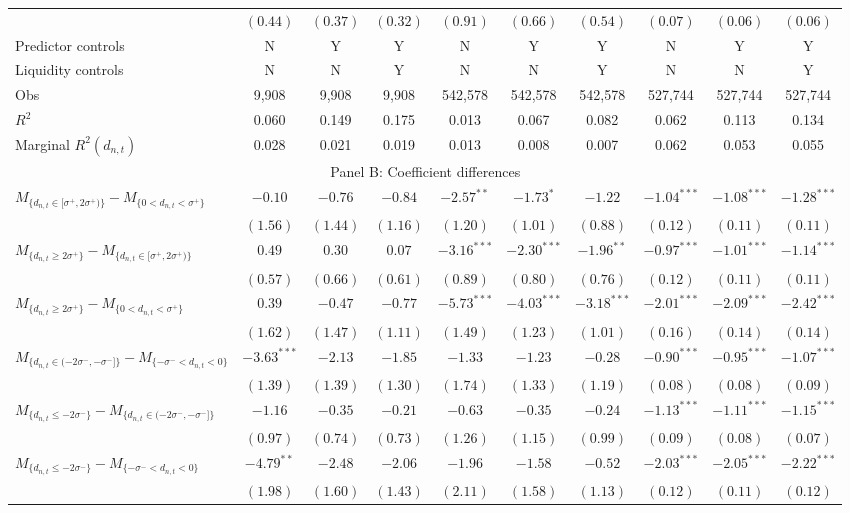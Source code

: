 \begin{tabular}{lccccccccc}
  \vspace{5pt}  & $(0.44)$ & $(0.37)$ & $(0.32)$ & $(0.91)$ & $(0.66)$ & $(0.54)$ & $(0.07)$ & $(0.06)$ & $(0.06)$ \\
  Predictor controls & N & Y & Y & N & Y & Y & N & Y & Y \\
  \vspace{5pt}Liquidity controls & N & N & Y & N & N & Y & N & N & Y \\
  Obs & 9,908 & 9,908 & 9,908 & 542,578 & 542,578 & 542,578 & 527,744 & 527,744 & 527,744 \\
  $R^2$ & 0.060 & 0.149 & 0.175 & 0.013 & 0.067 & 0.082 & 0.062 & 0.113 & 0.134 \\
  Marginal $R^2(d_{n,t})$ & 0.028 & 0.021 & 0.019 & 0.013 & 0.008 & 0.007 & 0.062 & 0.053 & 0.055 \\
   \hline \multicolumn{10}{c}{Panel B: Coefficient differences} \\
 \hline  $M_{\{d_{n,t} \in [\sigma^+, 2\sigma^+)\}} - M_{\{0 < d_{n,t} < \sigma^+\}}$ & $-0.10$ & $-0.76$ & $-0.84$ & $-2.57^{**}$ & $-1.73^{*}$ & $-1.22$ & $-1.04^{***}$ & $-1.08^{***}$ & $-1.28^{***}$ \\
   & $(1.56)$ & $(1.44)$ & $(1.16)$ & $(1.20)$ & $(1.01)$ & $(0.88)$ & $(0.12)$ & $(0.11)$ & $(0.11)$ \\
  $M_{\{d_{n,t} \ge 2\sigma^+\}} - M_{\{d_{n,t} \in [\sigma^+, 2\sigma^+)\}}$ & $0.49$ & $0.30$ & $0.07$ & $-3.16^{***}$ & $-2.30^{***}$ & $-1.96^{**}$ & $-0.97^{***}$ & $-1.01^{***}$ & $-1.14^{***}$ \\
   & $(0.57)$ & $(0.66)$ & $(0.61)$ & $(0.89)$ & $(0.80)$ & $(0.76)$ & $(0.12)$ & $(0.11)$ & $(0.11)$ \\
  $M_{\{d_{n,t} \ge 2\sigma^+\}} - M_{\{0 < d_{n,t} < \sigma^+\}}$ & $0.39$ & $-0.47$ & $-0.77$ & $-5.73^{***}$ & $-4.03^{***}$ & $-3.18^{***}$ & $-2.01^{***}$ & $-2.09^{***}$ & $-2.42^{***}$ \\
   & $(1.62)$ & $(1.47)$ & $(1.11)$ & $(1.49)$ & $(1.23)$ & $(1.01)$ & $(0.16)$ & $(0.14)$ & $(0.14)$ \\
  $M_{\{d_{n,t} \in (-2\sigma^-, -\sigma^-]\}} - M_{\{-\sigma^- < d_{n,t} < 0\}}$ & $-3.63^{***}$ & $-2.13$ & $-1.85$ & $-1.33$ & $-1.23$ & $-0.28$ & $-0.90^{***}$ & $-0.95^{***}$ & $-1.07^{***}$ \\
   & $(1.39)$ & $(1.39)$ & $(1.30)$ & $(1.74)$ & $(1.33)$ & $(1.19)$ & $(0.08)$ & $(0.08)$ & $(0.09)$ \\
  $M_{\{d_{n,t} \le -2\sigma^-\}} - M_{\{d_{n,t} \in (-2\sigma^-, -\sigma^-]\}}$ & $-1.16$ & $-0.35$ & $-0.21$ & $-0.63$ & $-0.35$ & $-0.24$ & $-1.13^{***}$ & $-1.11^{***}$ & $-1.15^{***}$ \\
   & $(0.97)$ & $(0.74)$ & $(0.73)$ & $(1.26)$ & $(1.15)$ & $(0.99)$ & $(0.09)$ & $(0.08)$ & $(0.07)$ \\
  $M_{\{d_{n,t} \le -2\sigma^-\}} - M_{\{-\sigma^- < d_{n,t} < 0\}}$ & $-4.79^{**}$ & $-2.48$ & $-2.06$ & $-1.96$ & $-1.58$ & $-0.52$ & $-2.03^{***}$ & $-2.05^{***}$ & $-2.22^{***}$ \\
   & $(1.98)$ & $(1.60)$ & $(1.43)$ & $(2.11)$ & $(1.58)$ & $(1.13)$ & $(0.12)$ & $(0.11)$ & $(0.12)$ \\
   \hline 
\end{tabular}
